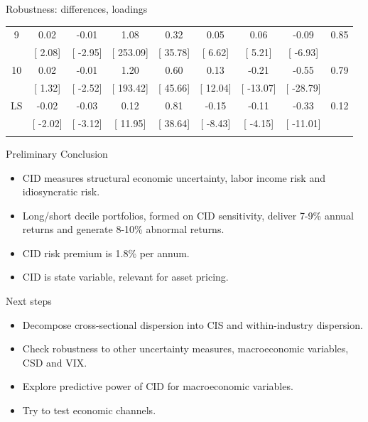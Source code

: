\documentclass{beamer}
\begin{document}
\begin{frame}{Robustness: differences, loadings}
\begin{table}[!htbp]
\begin{tabular}{@{\extracolsep{0pt}} ccccccccc}
9 & 0.02 & -0.01 & 1.08 & 0.32 & 0.05 & 0.06 & -0.09 & 0.85 \\ 
 & [ 2.08] & [ -2.95] & [ 253.09] & [ 35.78] & [ 6.62] & [ 5.21] & [ -6.93] &  \\ 
10 & 0.02 & -0.01 & 1.20 & 0.60 & 0.13 & -0.21 & -0.55 & 0.79 \\ 
 & [ 1.32] & [ -2.52] & [ 193.42] & [ 45.66] & [ 12.04] & [ -13.07] & [ -28.79] &  \\ 
LS & -0.02 & -0.03 & 0.12 & 0.81 & -0.15 & -0.11 & -0.33 & 0.12 \\ 
 & [ -2.02] & [ -3.12] & [ 11.95] & [ 38.64] & [ -8.43] & [ -4.15] & [ -11.01] &  \\ 
\hline \\[-1.8ex] 
\end{tabular} 
\end{table}

\end{frame}


\begin{frame}{Preliminary Conclusion}
\begin{itemize}
    \item {CID measures structural economic uncertainty, labor income risk and idiosyncratic risk.}
    \item {Long/short decile portfolios, formed on CID sensitivity, deliver 7-9\% annual returns and generate 8-10\% abnormal returns.}
    \item {CID risk premium is 1.8\% per annum.}
    \item {CID is state variable, relevant for asset pricing.}
\end{itemize}
\end{frame}

\begin{frame}{Next steps}
\begin{itemize}
    \item {Decompose cross-sectional dispersion into CIS and within-industry dispersion.}
    \item {Check robustness to other uncertainty measures, macroeconomic variables, CSD and VIX.}
    \item {Explore predictive power of CID for macroeconomic variables.}
    \item {Try to test economic channels.}
\end{itemize}
\end{frame}
\end{document}
